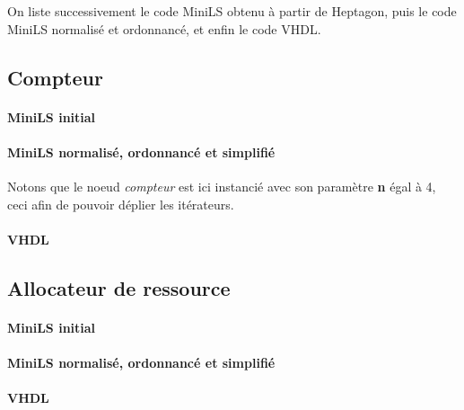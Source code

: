 \documentclass[9pt,a4paper]{article}
\newcommand{\LANG}{Heptagon}
\begin{document}
On liste successivement le code MiniLS obtenu à partir de \LANG{}, puis le code
MiniLS normalisé et ordonnancé, et enfin le code VHDL.

\subsection{Compteur}

\paragraph{MiniLS initial}

\small

\normalsize

\paragraph{MiniLS normalisé, ordonnancé et simplifié}

Notons que le noeud \textit{compteur} est ici instancié avec son paramètre
\textbf{n} égal à 4, ceci afin de pouvoir déplier les itérateurs.

\small

\normalsize

\paragraph{VHDL}

\small

\normalsize

\subsection{Allocateur de ressource}

\paragraph{MiniLS initial}

\small

\normalsize

\paragraph{MiniLS normalisé, ordonnancé et simplifié}

\small

\normalsize

\paragraph{VHDL}
\end{document}
